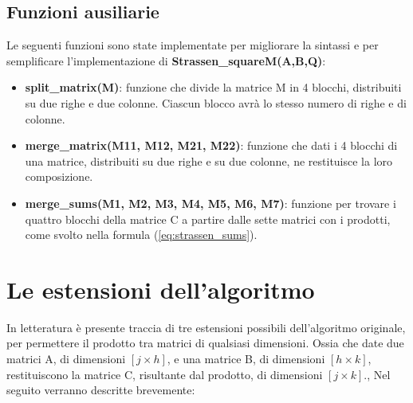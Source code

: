 \documentclass[10pt,a4paper,twoside]{tau-book}
\begin{document}
\subsection{Funzioni ausiliarie}
\label{subsec:funzioni_ausiliarie_square_strassen}

Le seguenti funzioni sono state implementate per migliorare la sintassi e per semplificare l’implementazione di \textbf{Strassen\_squareM(A,B,Q)}:

\begin{itemize}
    \item \textbf{split\_matrix(M)}: funzione che divide la matrice M in 4 blocchi, distribuiti su due righe e due colonne. Ciascun blocco avrà lo stesso numero di righe e di colonne.
    \item \textbf{merge\_matrix(M11, M12, M21, M22)}: funzione che dati i 4 blocchi di una matrice, distribuiti su due righe e su due colonne, ne restituisce la loro composizione.
    \item \textbf{merge\_sums(M1, M2, M3, M4, M5, M6, M7)}: funzione per trovare i quattro blocchi della matrice C a partire dalle sette matrici con i prodotti, come svolto nella formula (\ref{eq:strassen_sums}).
\end{itemize}


\section{Le estensioni dell'algoritmo}
\label{sec:strassen_odd_matrix}

In letteratura è presente traccia di tre estensioni possibili dell'algoritmo originale, per permettere il prodotto tra matrici di qualsiasi dimensioni. Ossia che date due matrici A, di dimensioni $[j\times h]$, e una matrice B, di dimensioni $[h \times k]$, restituiscono la matrice C, risultante dal prodotto, di dimensioni $[j\times k]$., Nel seguito verranno descritte brevemente:
\end{document}
